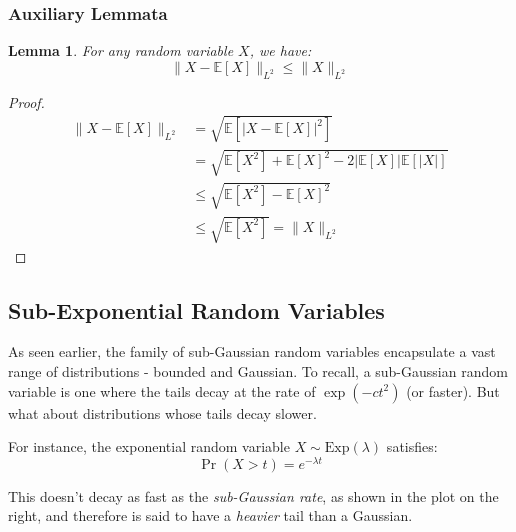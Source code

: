 \documentclass{article}
\newtheorem{lemma}{Lemma}[subsection]
\theoremstyle{remark}
\newcommand{\Exp}{\mathbb{E}}
\begin{document}
\subsubsection{Auxiliary Lemmata}
\begin{lemma}
\label{lem:l2-centering}
For any random variable \(X\), we have:
\begin{equation*}
\|X - \Exp[X]\|_{L^{2}} \leq \|X\|_{L^{2}}
\end{equation*}
\end{lemma}

\begin{proof}
\begin{align*}
\|X - \Exp[X]\|_{L^{2}} &= \sqrt{\Exp[|X - \Exp[X]|^{2}]} \\
&= \sqrt{\Exp[X^{2}] + \Exp[X]^{2} - 2|\Exp[X]|\Exp[|X|]} \\
&\leq \sqrt{\Exp[X^{2}] - \Exp[X]^{2}} \\
&\leq \sqrt{\Exp[X^{2}]} = \|X\|_{L^{2}}
\end{align*}
\end{proof}

\subsection{Sub-Exponential Random Variables}
As seen earlier, the family of sub-Gaussian random variables encapsulate a vast range of distributions - bounded and Gaussian. To recall, a sub-Gaussian random variable is one where the tails decay at the rate of \(\exp(-ct^{2})\) (or faster). But what about distributions whose tails decay slower.

\begin{minipage}{0.29\linewidth}
\end{minipage}
\hfill
\begin{minipage}{0.7\linewidth}
For instance, the exponential random variable \(X \sim \mathrm{Exp}(\lambda)\) satisfies:
\begin{equation*}
\Pr(X > t) = e^{-\lambda t}
\end{equation*}

This doesn't decay as fast as the \emph{sub-Gaussian rate}, as shown in the plot on the right, and therefore is said to have a \emph{heavier} tail than a Gaussian.
\end{minipage}
\end{document}
